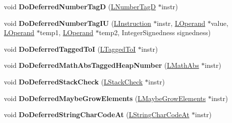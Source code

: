 \begin{DoxyCompactItemize}
\item 
void {\bfseries Do\+Deferred\+Number\+TagD} (\hyperlink{classv8_1_1internal_1_1_l_number_tag_d}{L\+Number\+TagD} $\ast$instr)\hypertarget{classv8_1_1internal_1_1_l_code_gen_af3b589c0911c5e01a018ecee64b7e926}{}\label{classv8_1_1internal_1_1_l_code_gen_af3b589c0911c5e01a018ecee64b7e926}

\item 
void {\bfseries Do\+Deferred\+Number\+Tag\+IU} (\hyperlink{classv8_1_1internal_1_1_l_instruction}{L\+Instruction} $\ast$instr, \hyperlink{classv8_1_1internal_1_1_l_operand}{L\+Operand} $\ast$value, \hyperlink{classv8_1_1internal_1_1_l_operand}{L\+Operand} $\ast$temp1, \hyperlink{classv8_1_1internal_1_1_l_operand}{L\+Operand} $\ast$temp2, Integer\+Signedness signedness)\hypertarget{classv8_1_1internal_1_1_l_code_gen_a81fedc95085cf988c8e3d548e1c9a5f1}{}\label{classv8_1_1internal_1_1_l_code_gen_a81fedc95085cf988c8e3d548e1c9a5f1}

\item 
void {\bfseries Do\+Deferred\+Tagged\+ToI} (\hyperlink{classv8_1_1internal_1_1_l_tagged_to_i}{L\+Tagged\+ToI} $\ast$instr)\hypertarget{classv8_1_1internal_1_1_l_code_gen_a64133c7509f54dc0bd30c3bbb07db4ad}{}\label{classv8_1_1internal_1_1_l_code_gen_a64133c7509f54dc0bd30c3bbb07db4ad}

\item 
void {\bfseries Do\+Deferred\+Math\+Abs\+Tagged\+Heap\+Number} (\hyperlink{classv8_1_1internal_1_1_l_math_abs}{L\+Math\+Abs} $\ast$instr)\hypertarget{classv8_1_1internal_1_1_l_code_gen_aa6e5b6dba176a4572ce81dcc27b057aa}{}\label{classv8_1_1internal_1_1_l_code_gen_aa6e5b6dba176a4572ce81dcc27b057aa}

\item 
void {\bfseries Do\+Deferred\+Stack\+Check} (\hyperlink{classv8_1_1internal_1_1_l_stack_check}{L\+Stack\+Check} $\ast$instr)\hypertarget{classv8_1_1internal_1_1_l_code_gen_a273730f2504ea249d9deb8dde7b314ee}{}\label{classv8_1_1internal_1_1_l_code_gen_a273730f2504ea249d9deb8dde7b314ee}

\item 
void {\bfseries Do\+Deferred\+Maybe\+Grow\+Elements} (\hyperlink{classv8_1_1internal_1_1_l_maybe_grow_elements}{L\+Maybe\+Grow\+Elements} $\ast$instr)\hypertarget{classv8_1_1internal_1_1_l_code_gen_afe319c35fc8adaff35f3417fb7c833d6}{}\label{classv8_1_1internal_1_1_l_code_gen_afe319c35fc8adaff35f3417fb7c833d6}

\item 
void {\bfseries Do\+Deferred\+String\+Char\+Code\+At} (\hyperlink{classv8_1_1internal_1_1_l_string_char_code_at}{L\+String\+Char\+Code\+At} $\ast$instr)\hypertarget{classv8_1_1internal_1_1_l_code_gen_a6b229168338a73ef11c203f845b68cb4}{}\label{classv8_1_1internal_1_1_l_code_gen_a6b229168338a73ef11c203f845b68cb4}


\end{DoxyCompactItemize}
